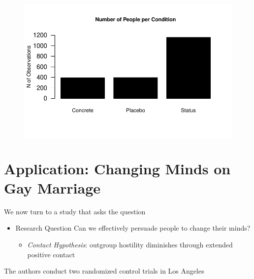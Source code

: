 \documentclass[
  letterpaper,
  DIV=11,
  numbers=noendperiod]{scrreprt}
\providecommand{\tightlist}{%
  \setlength{\itemsep}{0pt}\setlength{\parskip}{0pt}}\usepackage{longtable,booktabs,array}
\begin{document}
\begin{figure}[H]

{\centering \includegraphics{04-Visualization_files/figure-pdf/unnamed-chunk-13-1.pdf}

}

\end{figure}

\hypertarget{application-changing-minds-on-gay-marriage}{%
\section{Application: Changing Minds on Gay
Marriage}\label{application-changing-minds-on-gay-marriage}}

We now turn to a study that asks the question

\begin{itemize}
\tightlist
\item
  Research Question Can we effectively persuade people to change their
  minds?

  \begin{itemize}
  \tightlist
  \item
    \emph{Contact Hypothesis}: outgroup hostility diminishes through
    extended positive contact
  \end{itemize}
\end{itemize}

The authors conduct two randomized control trials in Los Angeles
\end{document}
